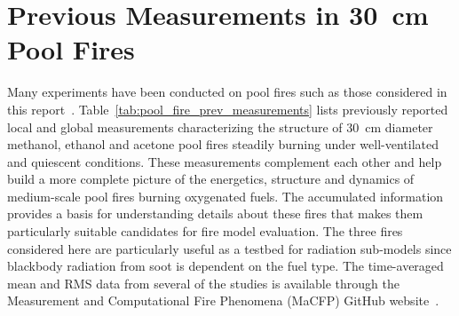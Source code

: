 \documentclass[12pt]{article}
\begin{document}
\section{Previous Measurements in 30~cm Pool Fires}
Many experiments have been conducted on pool fires such as those considered in this report~\cite{Weckman1996,Kim2019,Hamins1994, Klassen1994,Hamins1991,Hamins2016,Wang2019,Buch1997,Hogben1998,Weckman1989,Corlett1966,Sung2019}.  Table~\ref{tab:pool_fire_prev_measurements} lists previously reported local and global measurements characterizing the structure of 30~cm diameter methanol, ethanol and acetone pool fires steadily burning under well-ventilated and quiescent conditions. These measurements complement each other and help build a more complete picture of the energetics, structure and dynamics of medium-scale pool fires burning oxygenated fuels. The accumulated information provides a basis for understanding details about these fires that makes them particularly suitable candidates for fire model evaluation. The three fires considered here are particularly useful as a testbed for radiation sub-models since blackbody radiation from soot is dependent on the fuel type. The time-averaged mean and RMS data from several of the studies is available through the Measurement and Computational Fire Phenomena (MaCFP) GitHub website~\cite{MaCFp}.
\end{document}
